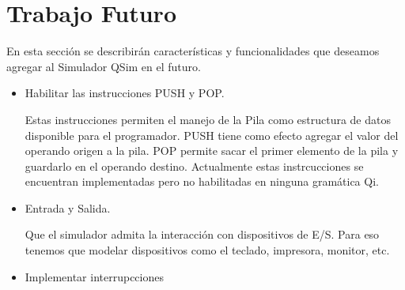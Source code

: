 

\section{Trabajo Futuro}

En esta sección se describirán características y funcionalidades que deseamos agregar al Simulador QSim en el futuro.

\begin{itemize}

\item Habilitar las instrucciones PUSH y POP.

Estas instrucciones permiten el manejo de la Pila como estructura de datos disponible para el programador. 
PUSH tiene como efecto agregar el valor del operando origen a la pila. 
POP permite sacar el primer elemento de la pila y guardarlo en el operando destino.
Actualmente estas instrcucciones se encuentran implementadas pero no habilitadas en ninguna gramática Qi.

\item Entrada y Salida.

Que el simulador admita la interacción con dispositivos de E/S. Para eso tenemos que modelar dispositivos como el teclado, impresora, monitor, etc.

\item Implementar interrupcciones

\end{itemize}
